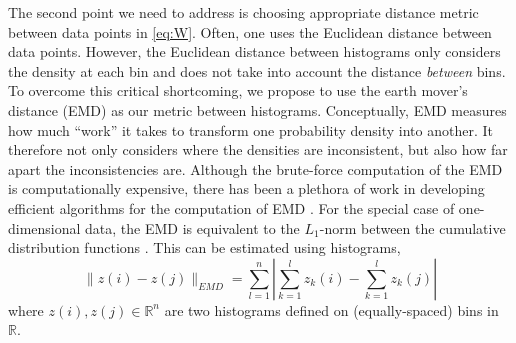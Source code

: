 \documentclass[prl, reprint, final, showkeys]{revtex4-1}
\begin{document}
The second point we need to address is choosing appropriate distance metric between data points in \eqref{eq:W}.
%
Often, one uses the Euclidean distance between data points.
%
However, the Euclidean distance between histograms only considers the density at each bin and does not take into account the distance {\em between} bins.
%
%
%
To overcome this critical shortcoming, we propose to use the earth mover's distance (EMD) \cite{rubner2000earth} as our metric between histograms.
%
Conceptually, EMD measures how much ``work'' it takes to transform one probability density into another.
%
It therefore not only considers where the densities are inconsistent, but also how far apart the inconsistencies are.
%
Although the brute-force computation of the EMD is computationally expensive, there has been a plethora of work in developing efficient algorithms for the computation of EMD \cite{Pele-eccv2008, Pele-iccv2009}.
%
%
%
For the special case of one-dimensional data, the EMD is equivalent to the $L_1$-norm between the cumulative distribution functions \cite{rubner2000perceptual}.
%
This can be estimated using histograms, 
\begin{equation}
\| z(i) - z(j) \|_{EMD} = \sum_{l=1}^{n} \left| \sum_{k=1}^l z_k(i) - \sum_{k=1}^l z_k(j) \right|
\end{equation}
where $z(i), z(j) \in \mathbb{R}^n$ are two histograms defined on (equally-spaced) bins in $\mathbb{R}$. 
\end{document}
